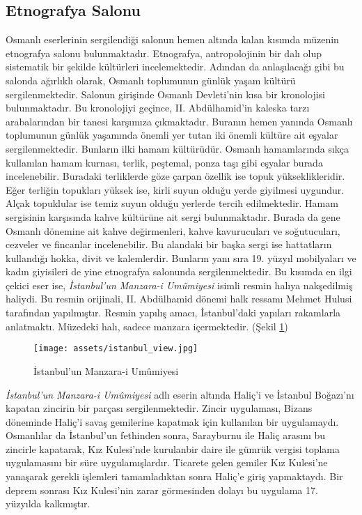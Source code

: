 \subsection{Etnografya Salonu}
\indent\indent Osmanlı eserlerinin sergilendiği salonun hemen altında kalan kısımda müzenin etnografya salonu bulunmaktadır. Etnografya, antropolojinin bir dalı olup sistematik bir şekilde kültürleri incelemektedir. Adından da anlaşılacağı gibi bu salonda ağırlıklı olarak, Osmanlı toplumunun günlük yaşam kültürü sergilenmektedir. Salonun girişinde Osmanlı Devleti'nin kısa bir kronolojisi bulunmaktadır. Bu kronolojiyi geçince, II. Abdülhamid'in kaleska tarzı arabalarından bir tanesi karşımıza çıkmaktadır. Buranın hemen yanında Osmanlı toplumunun günlük yaşamında önemli yer tutan iki önemli kültüre ait eşyalar sergilenmektedir. Bunların ilki hamam kültürüdür. Osmanlı hamamlarında sıkça kullanılan hamam kurnası, terlik, peştemal, ponza taşı gibi eşyalar burada incelenebilir. Buradaki terliklerde göze çarpan özellik ise topuk yükseklikleridir. Eğer terliğin topukları yüksek ise, kirli suyun olduğu yerde giyilmesi uygundur. Alçak topuklular ise temiz suyun olduğu yerlerde tercih edilmektedir. Hamam sergisinin karşısında kahve kültürüne ait sergi bulunmaktadır. Burada da gene Osmanlı dönemine ait kahve değirmenleri, kahve kavurucuları ve soğutucuları, cezveler ve fincanlar incelenebilir. Bu alandaki bir başka sergi ise hattatların kullandığı hokka, divit ve kalemlerdir. Bunların yanı sıra 19. yüzyıl mobilyaları ve kadın giyisileri de yine etnografya salonunda sergilenmektedir.\newline
\indent Bu kısımda en ilgi çekici eser ise, \textit{İstanbul'un Manzara-i Umûmiyesi} isimli resmin halıya nakşedilmiş haliydi. Bu resmin orijinali, II. Abdülhamid dönemi halk ressamı Mehmet Hulusi tarafından yapılmıştır. Resmin yapılış amacı, İstanbul'daki yapıları rakamlarla anlatmaktı. Müzedeki halı, sadece manzara içermektedir. (Şekil \ref{fig:istanbul_view})\newline
\begin{figure}[H]
    \centering
    \texttt{[image: assets/istanbul\_view.jpg]}
    \caption{İstanbul'un Manzara-i Umûmiyesi}
    \label{fig:istanbul_view}
\end{figure}
\indent \textit{İstanbul'un Manzara-i Umûmiyesi} adlı eserin altında Haliç'i ve İstanbul Boğazı'nı kapatan zincirin bir parçası sergilenmektedir. Zincir uygulaması, Bizans döneminde Haliç'i savaş gemilerine kapatmak için kullanılan bir uygulamaydı. Osmanlılar da İstanbul'un fethinden sonra, Sarayburnu ile Haliç arasını bu zincirle kapatarak, Kız Kulesi'nde kurulanbir daire ile gümrük vergisi toplama uygulamasını bir süre uygulamışlardır. Ticarete gelen gemiler Kız Kulesi'ne yanaşarak gerekli işlemleri tamamladıktan sonra Haliç'e giriş yapmaktaydı. Bir deprem sonrası Kız Kulesi'nin zarar görmesinden dolayı bu uygulama 17. yüzyılda kalkmıştır.